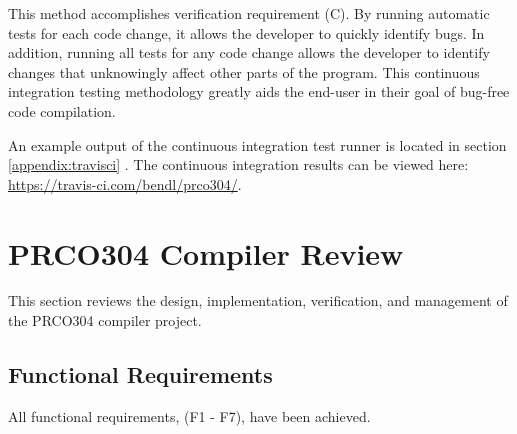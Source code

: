 \documentclass[11pt,a4paper]{report}
\newcommand{\scname}{PRCO304}
\begin{document}
This method accomplishes verification requirement (C). By running automatic tests for each code change, it allows the developer to quickly identify bugs. In addition, running all tests for any code change allows the developer to identify changes that unknowingly affect other parts of the program. This continuous integration testing methodology greatly aids the end-user in their goal of bug-free code compilation.

An example output of the continuous integration test runner is located in section \ref{appendix:travisci} {}. The continuous integration results can be viewed here: \url{https://travis-ci.com/bendl/prco304/}.

\newpage
\section{\scname{} Compiler Review}
This section reviews the design, implementation, verification, and management of the \scname{} compiler project.

\subsection{Functional Requirements}
All functional requirements, (F1 - F7), have been achieved. 
\end{document}
